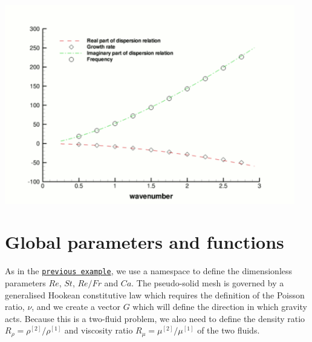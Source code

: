  
\begin{DoxyImage}
\includegraphics[width=0.95\textwidth]{two_layer_interface_code_validation}
\end{DoxyImage}




 

\hypertarget{index_namespace}{}\section{Global parameters and functions}\label{index_namespace}
As in the \href{../../single_layer_free_surface/html/index.html#namespace}{\tt previous example}, we use a namespace to define the dimensionless parameters $ Re $, $ St $, $ Re/Fr $ and $ Ca $. The pseudo-\/solid mesh is governed by a generalised Hookean constitutive law which requires the definition of the Poisson ratio, $ \nu $, and we create a vector $ G $ which will define the direction in which gravity acts. Because this is a two-\/fluid problem, we also need to define the density ratio $ R_{\rho} = \rho^{[2]}/\rho^{[1]} $ and viscosity ratio $ R_{\mu} = \mu^{[2]}/\mu^{[1]} $ of the two fluids.

